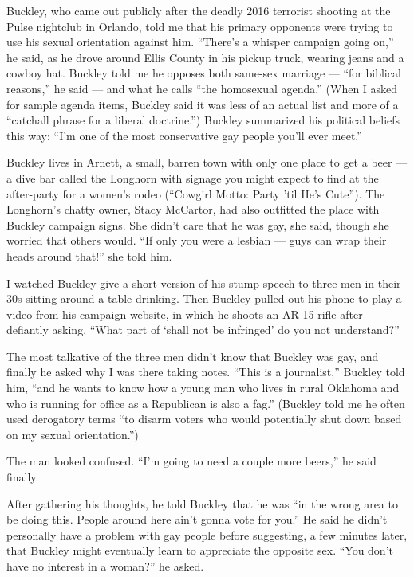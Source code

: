 Buckley, who came out publicly after the deadly 2016 terrorist shooting
at the Pulse nightclub in Orlando, told me that his primary opponents
were trying to use his sexual orientation against him. ``There's a
whisper campaign going on,'' he said, as he drove around Ellis County in
his pickup truck, wearing jeans and a cowboy hat. Buckley told me he
opposes both same-sex marriage --- ``for biblical reasons,'' he said ---
and what he calls ``the homosexual agenda.'' (When I asked for sample
agenda items, Buckley said it was less of an actual list and more of a
``catchall phrase for a liberal doctrine.'') Buckley summarized his
political beliefs this way: ``I'm one of the most conservative gay
people you'll ever meet.''

Buckley lives in Arnett, a small, barren town with only one place to get
a beer --- a dive bar called the Longhorn with signage you might expect
to find at the after-party for a women's rodeo (``Cowgirl Motto: Party
'til He's Cute''). The Longhorn's chatty owner, Stacy McCartor, had also
outfitted the place with Buckley campaign signs. She didn't care that he
was gay, she said, though she worried that others would. ``If only you
were a lesbian --- guys can wrap their heads around that!'' she told
him.

I watched Buckley give a short version of his stump speech to three men
in their 30s sitting around a table drinking. Then Buckley pulled out
his phone to play a video from his campaign website, in which he shoots
an AR-15 rifle after defiantly asking, ``What part of `shall not be
infringed' do you not understand?''

The most talkative of the three men didn't know that Buckley was gay,
and finally he asked why I was there taking notes. ``This is a
journalist,'' Buckley told him, ``and he wants to know how a young man
who lives in rural Oklahoma and who is running for office as a
Republican is also a fag.'' (Buckley told me he often used derogatory
terms ``to disarm voters who would potentially shut down based on my
sexual orientation.'')

The man looked confused. ``I'm going to need a couple more beers,'' he
said finally.

After gathering his thoughts, he told Buckley that he was ``in the wrong
area to be doing this. People around here ain't gonna vote for you.'' He
said he didn't personally have a problem with gay people before
suggesting, a few minutes later, that Buckley might eventually learn to
appreciate the opposite sex. ``You don't have no interest in a woman?''
he asked.


